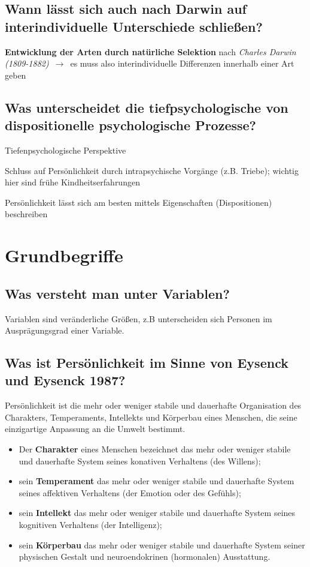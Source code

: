 \documentclass[a6paper,9pt,DIV=14]{scrartcl}
\begin{document}
\subsection{Wann lässt sich auch nach Darwin auf interindividuelle Unterschiede schließen?}  %
    \textbf{Entwicklung der Arten durch natürliche Selektion} nach \textit{Charles Darwin (1809-1882)} $\,\to\,$ es muss also interindividuelle Differenzen innerhalb einer Art geben
\subsection{Was unterscheidet die tiefpsychologische von dispositionelle psychologische Prozesse?}
    \begin{labeling}{Tiefenpsychologische Perspektive}
    \item [Tiefenpsychologische Perspektive] Schluss auf Persönlichkeit durch intrapsychische Vorgänge (z.B. Triebe); wichtig hier sind frühe Kindheitserfahrungen
    \item [Dispositionelle Perspektive] Persönlichkeit lässt sich am besten mittels Eigenschaften (Dispositionen) beschreiben
    \end{labeling}



\section{Grundbegriffe}

\subsection{Was versteht man unter Variablen?}
    Variablen sind veränderliche Größen, z.B unterscheiden sich Personen im Ausprägungsgrad einer Variable.
\subsection{Was ist Persönlichkeit im Sinne von Eysenck und Eysenck 1987?} %
    Persönlichkeit ist die mehr oder weniger stabile und dauerhafte Organisation des Charakters, Temperaments, Intellekts und Körperbau eines Menschen, die seine einzigartige Anpassung an die Umwelt bestimmt.
    \begin{itemize}\itemsep-0.5ex
        \item Der \textbf{Charakter} eines Menschen bezeichnet das mehr oder weniger stabile und dauerhafte System seines konativen Verhaltens (des Willens);
        \item sein \textbf{Temperament} das mehr oder weniger stabile und dauerhafte System seines affektiven Verhaltens (der Emotion oder des Gefühls);
        \item sein \textbf{Intellekt} das mehr oder weniger stabile und dauerhafte System seines kognitiven Verhaltens (der Intelligenz);
        \item sein \textbf{Körperbau} das mehr oder weniger stabile und dauerhafte System seiner physischen Gestalt und neuroendokrinen (hormonalen) Ausstattung.
    \end{itemize}
\end{document}
